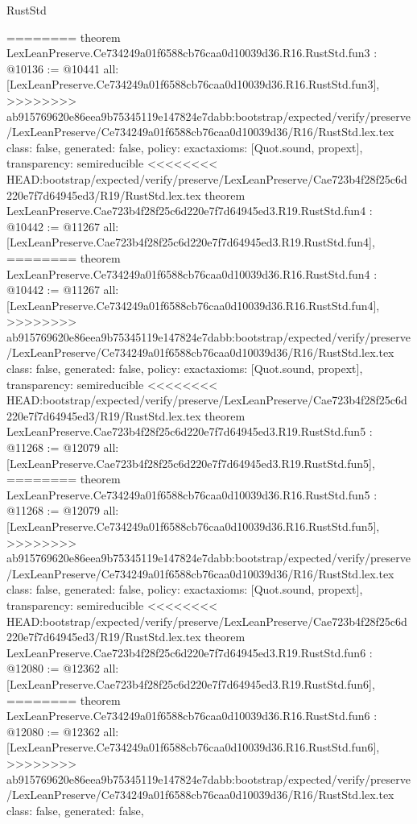 \begin{lexlean}{RustStd}
\begin{coremodule}
{\begin{coremodule}
{{{{{{========
theorem LexLeanPreserve.Ce734249a01f6588cb76caa0d10039d36.R16.RustStd.fun3 : @10136 := @10441 {
  all: [LexLeanPreserve.Ce734249a01f6588cb76caa0d10039d36.R16.RustStd.fun3],
>>>>>>>> ab915769620e86eea9b75345119e147824e7dabb:bootstrap/expected/verify/preserve/LexLeanPreserve/Ce734249a01f6588cb76caa0d10039d36/R16/RustStd.lex.tex
  class: false,
  generated: false,
  policy: exact{axioms: [Quot.sound, propext]},
  transparency: semireducible
}
<<<<<<<< HEAD:bootstrap/expected/verify/preserve/LexLeanPreserve/Cae723b4f28f25c6d220e7f7d64945ed3/R19/RustStd.lex.tex
theorem LexLeanPreserve.Cae723b4f28f25c6d220e7f7d64945ed3.R19.RustStd.fun4 : @10442 := @11267 {
  all: [LexLeanPreserve.Cae723b4f28f25c6d220e7f7d64945ed3.R19.RustStd.fun4],
========
theorem LexLeanPreserve.Ce734249a01f6588cb76caa0d10039d36.R16.RustStd.fun4 : @10442 := @11267 {
  all: [LexLeanPreserve.Ce734249a01f6588cb76caa0d10039d36.R16.RustStd.fun4],
>>>>>>>> ab915769620e86eea9b75345119e147824e7dabb:bootstrap/expected/verify/preserve/LexLeanPreserve/Ce734249a01f6588cb76caa0d10039d36/R16/RustStd.lex.tex
  class: false,
  generated: false,
  policy: exact{axioms: [Quot.sound, propext]},
  transparency: semireducible
}
<<<<<<<< HEAD:bootstrap/expected/verify/preserve/LexLeanPreserve/Cae723b4f28f25c6d220e7f7d64945ed3/R19/RustStd.lex.tex
theorem LexLeanPreserve.Cae723b4f28f25c6d220e7f7d64945ed3.R19.RustStd.fun5 : @11268 := @12079 {
  all: [LexLeanPreserve.Cae723b4f28f25c6d220e7f7d64945ed3.R19.RustStd.fun5],
========
theorem LexLeanPreserve.Ce734249a01f6588cb76caa0d10039d36.R16.RustStd.fun5 : @11268 := @12079 {
  all: [LexLeanPreserve.Ce734249a01f6588cb76caa0d10039d36.R16.RustStd.fun5],
>>>>>>>> ab915769620e86eea9b75345119e147824e7dabb:bootstrap/expected/verify/preserve/LexLeanPreserve/Ce734249a01f6588cb76caa0d10039d36/R16/RustStd.lex.tex
  class: false,
  generated: false,
  policy: exact{axioms: [Quot.sound, propext]},
  transparency: semireducible
}
<<<<<<<< HEAD:bootstrap/expected/verify/preserve/LexLeanPreserve/Cae723b4f28f25c6d220e7f7d64945ed3/R19/RustStd.lex.tex
theorem LexLeanPreserve.Cae723b4f28f25c6d220e7f7d64945ed3.R19.RustStd.fun6 : @12080 := @12362 {
  all: [LexLeanPreserve.Cae723b4f28f25c6d220e7f7d64945ed3.R19.RustStd.fun6],
========
theorem LexLeanPreserve.Ce734249a01f6588cb76caa0d10039d36.R16.RustStd.fun6 : @12080 := @12362 {
  all: [LexLeanPreserve.Ce734249a01f6588cb76caa0d10039d36.R16.RustStd.fun6],
>>>>>>>> ab915769620e86eea9b75345119e147824e7dabb:bootstrap/expected/verify/preserve/LexLeanPreserve/Ce734249a01f6588cb76caa0d10039d36/R16/RustStd.lex.tex
  class: false,
  generated: false,
}}}}}}}}}}
\end{coremodule}}
\end{coremodule}
\end{lexlean}
